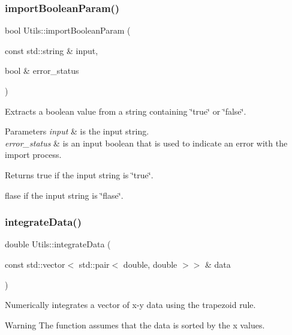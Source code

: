 \subsubsection{\texorpdfstring{import\+Boolean\+Param()}{importBooleanParam()}}
{\footnotesize\ttfamily bool Utils\+::import\+Boolean\+Param (\begin{DoxyParamCaption}\item[{const std\+::string \&}]{input,  }\item[{bool \&}]{error\+\_\+status }\end{DoxyParamCaption})}



Extracts a boolean value from a string containing \char`\"{}true\char`\"{} or \char`\"{}false\char`\"{}. 


\begin{DoxyParams}{Parameters}
{\em input} & is the input string. \\
\hline
{\em error\+\_\+status} & is an input boolean that is used to indicate an error with the import process. \\
\hline
\end{DoxyParams}
\begin{DoxyReturn}{Returns}
true if the input string is \char`\"{}true\char`\"{}. 

flase if the input string is \char`\"{}flase\char`\"{}. 
\end{DoxyReturn}
\mbox{\label{namespace_utils_a49411c9d4c7a065dbcf237aa27a84023}} 
\subsubsection{\texorpdfstring{integrate\+Data()}{integrateData()}}
{\footnotesize\ttfamily double Utils\+::integrate\+Data (\begin{DoxyParamCaption}\item[{const std\+::vector$<$ std\+::pair$<$ double, double $>$$>$ \&}]{data }\end{DoxyParamCaption})}



Numerically integrates a vector of x-\/y data using the trapezoid rule. 

\begin{DoxyWarning}{Warning}
The function assumes that the data is sorted by the x values. 
\end{DoxyWarning}


